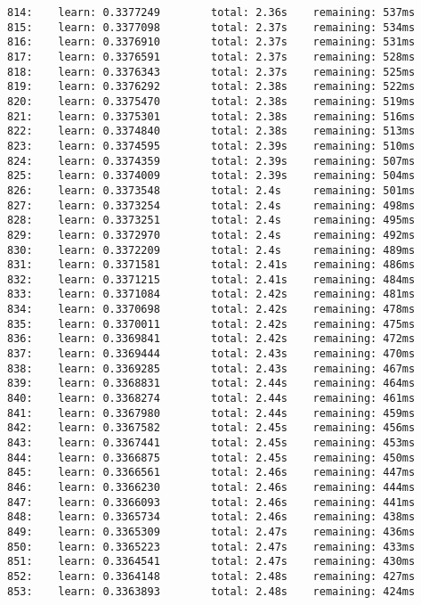 \documentclass[11pt]{article}
\begin{document}
\begin{Verbatim}[commandchars=\\\{\}]
814:    learn: 0.3377249        total: 2.36s    remaining: 537ms
815:    learn: 0.3377098        total: 2.37s    remaining: 534ms
816:    learn: 0.3376910        total: 2.37s    remaining: 531ms
817:    learn: 0.3376591        total: 2.37s    remaining: 528ms
818:    learn: 0.3376343        total: 2.37s    remaining: 525ms
819:    learn: 0.3376292        total: 2.38s    remaining: 522ms
820:    learn: 0.3375470        total: 2.38s    remaining: 519ms
821:    learn: 0.3375301        total: 2.38s    remaining: 516ms
822:    learn: 0.3374840        total: 2.38s    remaining: 513ms
823:    learn: 0.3374595        total: 2.39s    remaining: 510ms
824:    learn: 0.3374359        total: 2.39s    remaining: 507ms
825:    learn: 0.3374009        total: 2.39s    remaining: 504ms
826:    learn: 0.3373548        total: 2.4s     remaining: 501ms
827:    learn: 0.3373254        total: 2.4s     remaining: 498ms
828:    learn: 0.3373251        total: 2.4s     remaining: 495ms
829:    learn: 0.3372970        total: 2.4s     remaining: 492ms
830:    learn: 0.3372209        total: 2.4s     remaining: 489ms
831:    learn: 0.3371581        total: 2.41s    remaining: 486ms
832:    learn: 0.3371215        total: 2.41s    remaining: 484ms
833:    learn: 0.3371084        total: 2.42s    remaining: 481ms
834:    learn: 0.3370698        total: 2.42s    remaining: 478ms
835:    learn: 0.3370011        total: 2.42s    remaining: 475ms
836:    learn: 0.3369841        total: 2.42s    remaining: 472ms
837:    learn: 0.3369444        total: 2.43s    remaining: 470ms
838:    learn: 0.3369285        total: 2.43s    remaining: 467ms
839:    learn: 0.3368831        total: 2.44s    remaining: 464ms
840:    learn: 0.3368274        total: 2.44s    remaining: 461ms
841:    learn: 0.3367980        total: 2.44s    remaining: 459ms
842:    learn: 0.3367582        total: 2.45s    remaining: 456ms
843:    learn: 0.3367441        total: 2.45s    remaining: 453ms
844:    learn: 0.3366875        total: 2.45s    remaining: 450ms
845:    learn: 0.3366561        total: 2.46s    remaining: 447ms
846:    learn: 0.3366230        total: 2.46s    remaining: 444ms
847:    learn: 0.3366093        total: 2.46s    remaining: 441ms
848:    learn: 0.3365734        total: 2.46s    remaining: 438ms
849:    learn: 0.3365309        total: 2.47s    remaining: 436ms
850:    learn: 0.3365223        total: 2.47s    remaining: 433ms
851:    learn: 0.3364541        total: 2.47s    remaining: 430ms
852:    learn: 0.3364148        total: 2.48s    remaining: 427ms
853:    learn: 0.3363893        total: 2.48s    remaining: 424ms

\end{Verbatim}
\end{document}
